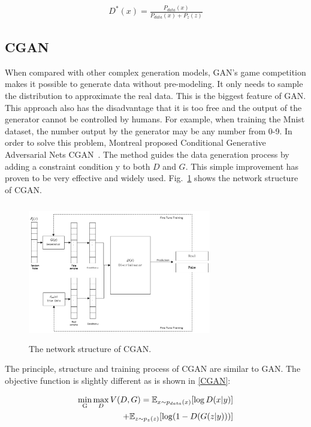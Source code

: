 \documentclass[conference]{IEEEtran}
\begin{document}
\begin{equation}
\begin{split}
\label{eq1}
	D^*(x)=\frac{P_{data}(x)}{P_{data}(x)+P_z(z)}
\end{split}
\end{equation}

\subsection{CGAN}

When compared with other complex generation models, GAN's game competition makes it possible to generate data without pre-modeling. It only needs to sample the distribution to approximate the real data. This is the biggest feature of GAN. This approach also has the disadvantage that it is too free and the output of the generator cannot be controlled by humans. For example, when training the Mnist dataset, the number output by the generator may be any number from 0-9. In order to solve this problem, Montreal proposed Conditional Generative Adversarial Nets CGAN~\cite{r12}. The method guides the data generation process by adding a constraint condition y to both $D$ and $G$. This simple improvement has proven to be very effective and widely used. Fig.~\ref{fig_cgan} shows the network structure of CGAN.

\begin{figure}[htbp]
\centerline{\includegraphics[width=8cm, height=6cm]{fig/cgan.png}}
\caption{The network structure of CGAN.}
\label{fig_cgan}
\end{figure}

The principle, structure and training process of CGAN are similar to GAN. The objective function is slightly different as is shown in \eqref{CGAN}:

\begin{equation}
\begin{split}
\label{CGAN}
	\mathop {\min }\limits_{\rm{G}} \mathop {\max }\limits_D V(D,G) = \mathbb{E}_{x\sim{p_{data}}(x)}[\log D(x|y)] \\
+ {\mathbb{E}_{z\sim{p_z}(z)}}[\log (1 - D(G(z|y)))]
\end{split}
\end{equation}
\end{document}
